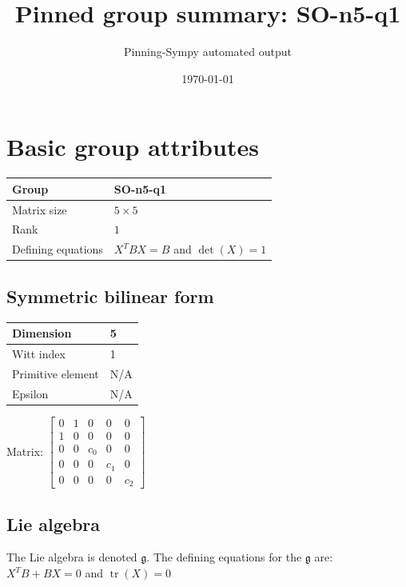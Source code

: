 \documentclass[11pt]{article}
\title{Pinned group summary: SO-n5-q1}
\author{Pinning-Sympy automated output}
\date{\today}
\newcommand{\frakg}{\mathfrak{g}}
\theoremstyle{definition}
\begin{document}
\maketitle
\tableofcontents

\newpage

\section{Basic group attributes}

\def\arraystretch{1.2}
\begin{tabular}{|l|l|}
	\hline
    Group & SO-n5-q1 \\
	\hline
    Matrix size & $5 \times 5$ \\
	\hline
    Rank & $1$ \\
	\hline
	Defining equations & $X^TBX = B$ and $\operatorname{det}(X)=1$ \\
	\hline
\end{tabular}
\def\arraystretch{1}

\subsection{Symmetric bilinear form}
\begin{tabular}{|l|l|}
    \hline
    Dimension & 5 \\
    \hline
    Witt index & 1 \\
    \hline
    Primitive element & N/A \\
    \hline
    Epsilon & N/A \\
    \hline
\end{tabular}

\bigskip
\noindent Matrix: \(
\left[\begin{matrix}0 & 1 & 0 & 0 & 0\\1 & 0 & 0 & 0 & 0\\0 & 0 & c_{0} & 0 & 0\\0 & 0 & 0 & c_{1} & 0\\0 & 0 & 0 & 0 & c_{2}\end{matrix}\right]
\)



\subsection{Lie algebra}

The Lie algebra is denoted $\frakg$. The defining equations for the $\frakg$ are: $X^TB + BX = 0$ and $\operatorname{tr}(X)=0$
\end{document}
